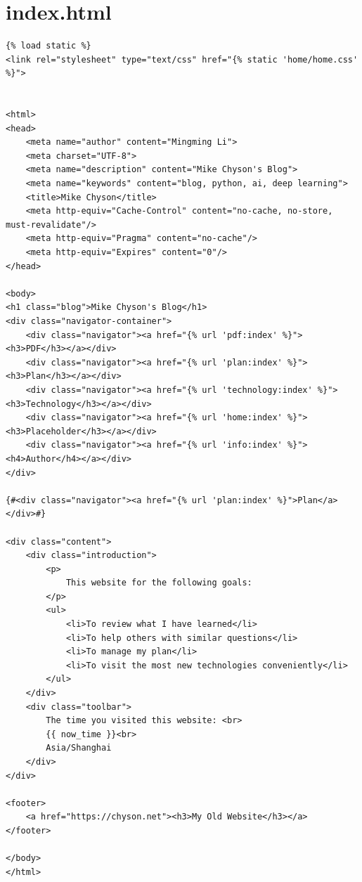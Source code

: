 \section{index.html}
\lstset{language=Html}
\begin{lstlisting}
{% load static %}
<link rel="stylesheet" type="text/css" href="{% static 'home/home.css' %}">


<html>
<head>
    <meta name="author" content="Mingming Li">
    <meta charset="UTF-8">
    <meta name="description" content="Mike Chyson's Blog">
    <meta name="keywords" content="blog, python, ai, deep learning">
    <title>Mike Chyson</title>
    <meta http-equiv="Cache-Control" content="no-cache, no-store, must-revalidate"/>
    <meta http-equiv="Pragma" content="no-cache"/>
    <meta http-equiv="Expires" content="0"/>
</head>

<body>
<h1 class="blog">Mike Chyson's Blog</h1>
<div class="navigator-container">
    <div class="navigator"><a href="{% url 'pdf:index' %}"><h3>PDF</h3></a></div>
    <div class="navigator"><a href="{% url 'plan:index' %}"><h3>Plan</h3></a></div>
    <div class="navigator"><a href="{% url 'technology:index' %}"><h3>Technology</h3></a></div>
    <div class="navigator"><a href="{% url 'home:index' %}"><h3>Placeholder</h3></a></div>
    <div class="navigator"><a href="{% url 'info:index' %}"><h4>Author</h4></a></div>
</div>

{#<div class="navigator"><a href="{% url 'plan:index' %}">Plan</a></div>#}

<div class="content">
    <div class="introduction">
        <p>
            This website for the following goals:
        </p>
        <ul>
            <li>To review what I have learned</li>
            <li>To help others with similar questions</li>
            <li>To manage my plan</li>
            <li>To visit the most new technologies conveniently</li>
        </ul>
    </div>
    <div class="toolbar">
        The time you visited this website: <br>
        {{ now_time }}<br>
        Asia/Shanghai
    </div>
</div>

<footer>
    <a href="https://chyson.net"><h3>My Old Website</h3></a>
</footer>

</body>
</html>
\end{lstlisting}


